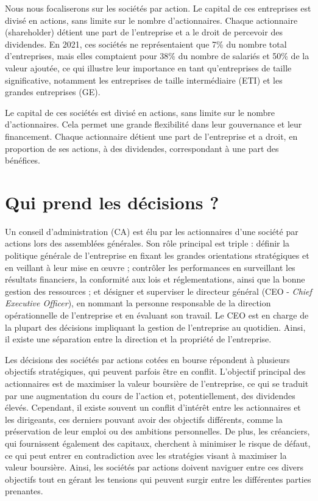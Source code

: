 \documentclass[a4paper, 12pt]{report}
\begin{document}
Nous nous focaliserons sur les sociétés par action. Le capital de ces entreprises est divisé en actions, sans limite sur le nombre d'actionnaires. Chaque actionnaire (shareholder) détient une part de l'entreprise et a le droit de percevoir des dividendes. En 2021, ces sociétés ne représentaient que 7\% du nombre total d'entreprises, mais elles comptaient pour 38\% du nombre de salariés et 50\% de la valeur ajoutée, ce qui illustre leur importance en tant qu'entreprises de taille significative, notamment les entreprises de taille intermédiaire (ETI) et les grandes entreprises (GE).

Le capital de ces sociétés est divisé en actions, sans limite sur le nombre d'actionnaires. Cela permet une grande flexibilité dans leur gouvernance et leur financement. Chaque actionnaire détient une part de l'entreprise et a droit, en proportion de ses actions, à des dividendes, correspondant à une part des bénéfices.

\section{Qui prend les décisions ?}
	
Un conseil d'administration (CA) est élu par les actionnaires d'une société par actions lors des assemblées générales. Son rôle principal est triple : définir la politique générale de l'entreprise en fixant les grandes orientations stratégiques et en veillant à leur mise en œuvre ; contrôler les performances en surveillant les résultats financiers, la conformité aux lois et réglementations, ainsi que la bonne gestion des ressources ; et désigner et superviser le directeur général (CEO - \textit{Chief Executive Officer}), en nommant la personne responsable de la direction opérationnelle de l'entreprise et en évaluant son travail. Le CEO est en charge de la plupart des décisions impliquant la gestion de l'entreprise au quotidien. Ainsi, il existe une séparation entre la direction et la propriété de l'entreprise.
	
Les décisions des sociétés par actions cotées en bourse répondent à plusieurs objectifs stratégiques, qui peuvent parfois être en conflit. L'objectif principal des actionnaires est de maximiser la valeur boursière de l'entreprise, ce qui se traduit par une augmentation du cours de l'action et, potentiellement, des dividendes élevés. Cependant, il existe souvent un conflit d'intérêt entre les actionnaires et les dirigeants, ces derniers pouvant avoir des objectifs différents, comme la préservation de leur emploi ou des ambitions personnelles. De plus, les créanciers, qui fournissent également des capitaux, cherchent à minimiser le risque de défaut, ce qui peut entrer en contradiction avec les stratégies visant à maximiser la valeur boursière. Ainsi, les sociétés par actions doivent naviguer entre ces divers objectifs tout en gérant les tensions qui peuvent surgir entre les différentes parties prenantes.
\end{document}
